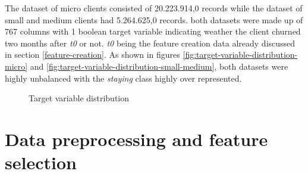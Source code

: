 \documentclass[LaM,binding=0.6cm, english]{sapthesis}
\begin{document}
The dataset of micro clients consisted of 20.223.914,0 records while the dataset of small and medium clients had 5.264.625,0 records. both datasets were made up of 767 columns with 1 boolean target variable indicating weather the client churned two months after \textit{t0} or not. \textit{t0} being the feature creation data already discussed in section \ref{feature-creation}. As shown in figures \ref{fig:target-variable-distribution-micro} and \ref{fig:target-variable-distribution-small-medium}, both datasets were highly unbalanced with the \textit{staying} class highly over represented.

\begin{figure}[!ht]
  \centering
  \hfill
  \caption{Target variable distribution}
\end{figure}

\section{Data preprocessing and feature selection}
\end{document}
